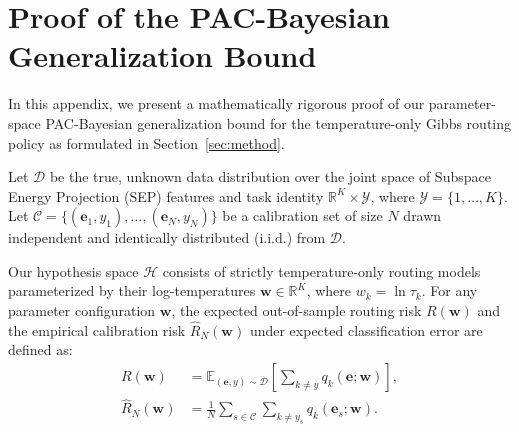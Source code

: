 \documentclass{article}
\theoremstyle{plain}
\theoremstyle{definition}
\theoremstyle{remark}
\begin{document}










\newpage
\appendix
\onecolumn
\section{Proof of the PAC-Bayesian Generalization Bound}
\label{app:proof}

In this appendix, we present a mathematically rigorous proof of our parameter-space PAC-Bayesian generalization bound for the temperature-only Gibbs routing policy as formulated in Section~\ref{sec:method}.

Let $\mathcal{D}$ be the true, unknown data distribution over the joint space of Subspace Energy Projection (SEP) features and task identity $\mathbb{R}^K \times \mathcal{Y}$, where $\mathcal{Y} = \{1, \dots, K\}$. Let $\mathcal{C} = \{(\mathbf{e}_1, y_1), \dots, (\mathbf{e}_N, y_N)\}$ be a calibration set of size $N$ drawn independent and identically distributed (i.i.d.) from $\mathcal{D}$.

Our hypothesis space $\mathcal{H}$ consists of strictly temperature-only routing models parameterized by their log-temperatures $\mathbf{w} \in \mathbb{R}^K$, where $w_k = \ln \tau_k$. For any parameter configuration $\mathbf{w}$, the expected out-of-sample routing risk $R(\mathbf{w})$ and the empirical calibration risk $\hat{R}_N(\mathbf{w})$ under expected classification error are defined as:
\begin{align}
    R(\mathbf{w}) &= \mathbb{E}_{(\mathbf{e}, y) \sim \mathcal{D}} \left[ \sum_{k \ne y} q_k(\mathbf{e}; \mathbf{w}) \right], \\
    \hat{R}_N(\mathbf{w}) &= \frac{1}{N} \sum_{s \in \mathcal{C}} \sum_{k \ne y_s} q_k(\mathbf{e}_s; \mathbf{w}).
\end{align}
\end{document}
